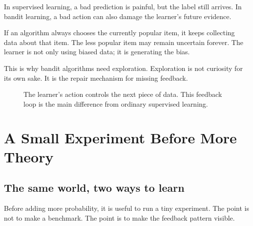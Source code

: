 \documentclass[en,nofont,11pt]{elegantbook}
\begin{document}
In supervised learning, a bad prediction is painful, but the label still arrives. In bandit learning, a bad action can also damage the learner's future evidence.

If an algorithm always chooses the currently popular item, it keeps collecting data about that item. The less popular item may remain uncertain forever. The learner is not only using biased data; it is generating the bias.

This is why bandit algorithms need exploration. Exploration is not curiosity for its own sake. It is the repair mechanism for missing feedback.

\begin{figure}[h]
\centering
{}
\caption{The learner's action controls the next piece of data. This feedback loop is the main difference from ordinary supervised learning.}
\end{figure}


\chapter{A Small Experiment Before More Theory}

\section{The same world, two ways to learn}

Before adding more probability, it is useful to run a tiny experiment. The point is not to make a benchmark. The point is to make the feedback pattern visible.
\end{document}
